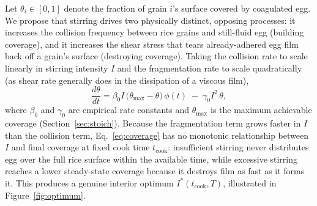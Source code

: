 \documentclass[11pt]{article}
\begin{document}
Let $\theta_i \in [0,1]$ denote the fraction of grain $i$'s surface covered by coagulated egg. We propose that stirring drives two physically distinct, opposing processes: it increases the collision frequency between rice grains and still-fluid egg (building coverage), and it increases the shear stress that tears already-adhered egg film back off a grain's surface (destroying coverage). Taking the collision rate to scale linearly in stirring intensity $I$ and the fragmentation rate to scale quadratically (as shear rate generally does in the dissipation of a viscous film),
\begin{equation}
    \frac{d\theta}{dt} = \beta_0 I \,\big(\theta_{\max} - \theta\big)\,\phi(t) \;-\; \gamma_0 I^2\, \theta,
    \label{eq:coverage}
\end{equation}
where $\beta_0$ and $\gamma_0$ are empirical rate constants and $\theta_{\max}$ is the maximum achievable coverage (Section~\ref{sec:stoich}). Because the fragmentation term grows faster in $I$ than the collision term, Eq.~\eqref{eq:coverage} has no monotonic relationship between $I$ and final coverage at fixed cook time $t_{\text{cook}}$: insufficient stirring never distributes egg over the full rice surface within the available time, while excessive stirring reaches a lower steady-state coverage because it destroys film as fast as it forms it. This produces a genuine interior optimum $I^*(t_{\text{cook}}, T)$, illustrated in Figure~\ref{fig:optimum}.
\end{document}
